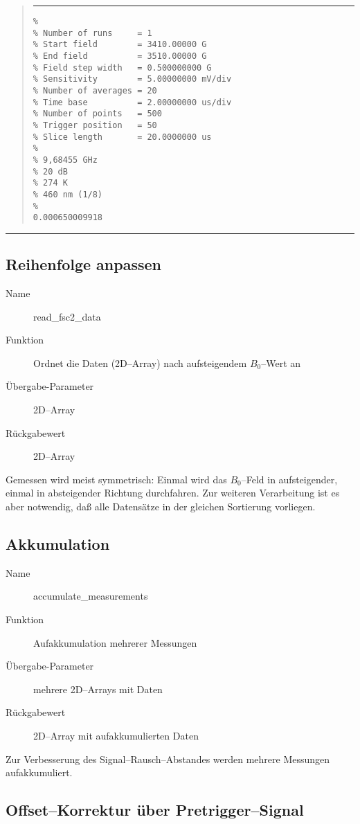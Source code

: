 \documentclass{article}
\newenvironment{Quote}{\begin{quote}\small\vspace*{1em}\hrule\vspace*{1ex}
}{\end{quote}\hrule\vspace*{1em}}
\begin{document}
\begin{Quote}
\begin{verbatim}
% 
% Number of runs     = 1
% Start field        = 3410.00000 G
% End field          = 3510.00000 G
% Field step width   = 0.500000000 G
% Sensitivity        = 5.00000000 mV/div
% Number of averages = 20
% Time base          = 2.00000000 us/div
% Number of points   = 500
% Trigger position   = 50
% Slice length       = 20.0000000 us
% 
% 9,68455 GHz
% 20 dB
% 274 K
% 460 nm (1/8)
% 
0.000650009918
\end{verbatim}
\end{Quote}



\subsection{Reihenfolge anpassen}

\begin{description}
  \item[Name] read\_fsc2\_data
  \item[Funktion] Ordnet die Daten (2D--Array) nach aufsteigendem $B_0$--Wert an
  \item[Übergabe-Parameter] 2D--Array
  \item[Rückgabewert] 2D--Array
\end{description}

Gemessen wird meist symmetrisch: Einmal wird das $B_0$--Feld in aufsteigender, 
einmal in absteigender Richtung durchfahren. Zur weiteren Verarbeitung ist es 
aber notwendig, daß alle Datensätze in der gleichen Sortierung vorliegen.


\subsection{Akkumulation}

\begin{description}
  \item[Name] accumulate\_measurements
  \item[Funktion] Aufakkumulation mehrerer Messungen
  \item[Übergabe-Parameter] mehrere 2D--Arrays mit Daten
  \item[Rückgabewert] 2D--Array mit aufakkumulierten Daten
\end{description}

Zur Verbesserung des Signal--Rausch--Abstandes werden mehrere Messungen 
aufakkumuliert.


\subsection{Offset--Korrektur über Pretrigger--Signal}
\end{document}
